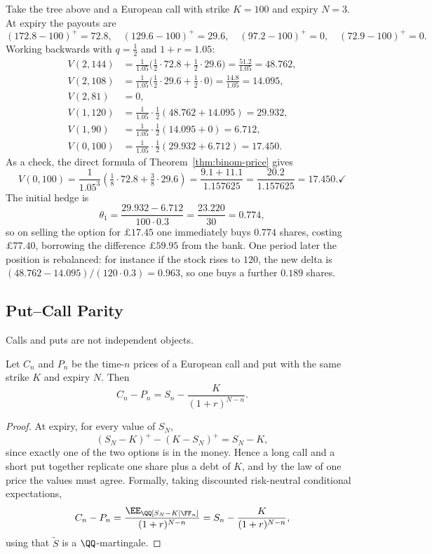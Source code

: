 \begin{example}\label{ex:binom-call}
	Take the tree above and a European call with strike $K = 100$ and expiry $N=3$. At expiry the payouts are
	$$
	(172.8-100)^+ = 72.8,\quad (129.6-100)^+ = 29.6,\quad (97.2-100)^+ = 0,\quad (72.9-100)^+ = 0.
	$$
	Working backwards with $q = \tfrac12$ and $1+r = 1.05$:
	\begin{align*}
		V(2,144) &= \tfrac{1}{1.05}\big(\tfrac12\cdot 72.8 + \tfrac12\cdot29.6\big) = \tfrac{51.2}{1.05} = 48.762,\\
		V(2,108) &= \tfrac{1}{1.05}\big(\tfrac12\cdot 29.6 + \tfrac12\cdot 0\big) = \tfrac{14.8}{1.05} = 14.095,\\
		V(2,81) &= 0,\\
		V(1,120) &= \tfrac{1}{1.05}\cdot\tfrac12(48.762+14.095) = 29.932,\\
		V(1,90) &= \tfrac{1}{1.05}\cdot\tfrac12(14.095 + 0) = 6.712,\\
		V(0,100) &= \tfrac{1}{1.05}\cdot\tfrac12(29.932+6.712) = 17.450.
	\end{align*}
	As a check, the direct formula of Theorem~\ref{thm:binom-price} gives
	$$
	V(0,100) = \frac{1}{1.05^3}\left(\tfrac18\cdot 72.8 + \tfrac38\cdot 29.6\right) = \frac{9.1+11.1}{1.157625} = \frac{20.2}{1.157625} = 17.450. \checkmark
	$$
	The initial hedge is
	$$
	\theta_1 = \frac{29.932 - 6.712}{100\cdot 0.3} = \frac{23.220}{30} = 0.774,
	$$
	so on selling the option for $\pounds 17.45$ one immediately buys $0.774$ shares, costing $\pounds 77.40$, borrowing the difference $\pounds 59.95$ from the bank. One period later the position is rebalanced: for instance if the stock rises to $120$, the new delta is $(48.762-14.095)/(120\cdot0.3) = 0.963$, so one buys a further $0.189$ shares.
\end{example}

\subsection{Put--Call Parity}

Calls and puts are not independent objects.

\begin{proposition}\label{prop:parity}
	Let $C_n$ and $P_n$ be the time-$n$ prices of a European call and put with the same strike $K$ and expiry $N$. Then
	$$
	C_n - P_n = S_n - \frac{K}{(1+r)^{N-n}}.
	$$
\end{proposition}

\begin{proof}
	At expiry, for every value of $S_N$,
	$$
	(S_N - K)^+ - (K-S_N)^+ = S_N - K,
	$$
	since exactly one of the two options is in the money. Hence a long call and a short put together replicate one share plus a debt of $K$, and by the law of one price the values must agree. Formally, taking discounted risk-neutral conditional expectations,
	$$
	C_n - P_n = \frac{\EE_\QQ[S_N - K \mid\FF_n]}{(1+r)^{N-n}} = S_n - \frac{K}{(1+r)^{N-n}},
	$$
	using that $\tilde S$ is a $\QQ$-martingale.
\end{proof}

